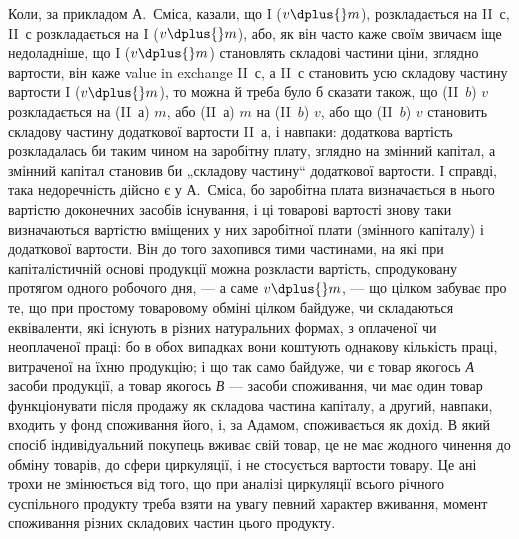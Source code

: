 Коли, за прикладом А.~Сміса, казали, що I ($v \dplus{} m$), розкладається на
II~$с$, II~$с$ розкладається на I ($v \dplus{} m$), або, як він часто каже своїм
звичаєм іще недоладніше, що I ($v \dplus{} m$) становлять складові частини ціни,
зглядно вартости, він каже value in exchange II~$с$, а II~$с$ становить усю
складову частину вартости I ($v \dplus{} m$), то можна й треба було б сказати
також, що (II~$b$) $v$ розкладається на (II~$а$) $m$, або (II~$а$) $m$ на (II~$b$) $v$,
або що (II~$b$) $v$ становить складову частину додаткової вартости II~$а$, і
навпаки: додаткова вартість розкладалась би таким чином на заробітну
плату, зглядно на змінний капітал, а змінний капітал становив би „складову
частину“ додаткової вартости. І справді, така недоречність дійсно
є у А.~Сміса, бо заробітна плата визначається в нього вартістю доконечних
засобів існування, і ці товарові вартості знову таки визначаються
вартістю вміщених у них заробітної плати (змінного капіталу) і додаткової
вартости. Він до того захопився тими частинами, на які при капіталістичній
основі продукції можна розкласти вартість, спродуковану протягом
одного робочого дня, — а саме $v \dplus{} m$, — що цілком забуває про те, що при
простому товаровому обміні цілком байдуже, чи складаються еквіваленти,
які існують в різних натуральних формах, з оплаченої чи неоплаченої праці:
бо в обох випадках вони коштують однакову кількість праці, витраченої
на їхню продукцію; і що так само байдуже, чи є товар якогось \emph{А} засоби
продукції, а товар якогось \emph{В} — засоби споживання, чи має один
товар функціонувати після продажу як складова частина капіталу, а
другий, навпаки, входить у фонд споживання його, і, за Адамом, споживається
як дохід. В який спосіб індивідуальний покупець вживає свій
товар, це не має жодного чинення до обміну товарів, до сфери циркуляції,
і не стосується вартости товару. Це ані трохи не змінюється
від того, що при аналізі циркуляції всього річного суспільного продукту
треба взяти на увагу певний характер вживання, момент споживання
різних складових частин цього продукту.

